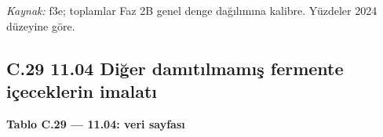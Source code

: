\endgroup

\emph{Kaynak:} \etiketT{} f3e; toplamlar Faz 2B genel denge dağılımına kalibre. Yüzdeler 2024 düzeyine göre.

\hypertarget{nace_kartlar_10-12-c29-1104-diux11fer-damux131tux131lmamux131ux15f-fermente-iuxe7eceklerin-imalatux131}{%
\subsection{C.29 11.04 Diğer damıtılmamış fermente içeceklerin imalatı}\label{nace_kartlar_10-12-c29-1104-diux11fer-damux131tux131lmamux131ux15f-fermente-iuxe7eceklerin-imalatux131}}


\textbf{Tablo C.29 --- 11.04: veri sayfası}

\nopagebreak[4]

\begingroup\gbtablo\small

